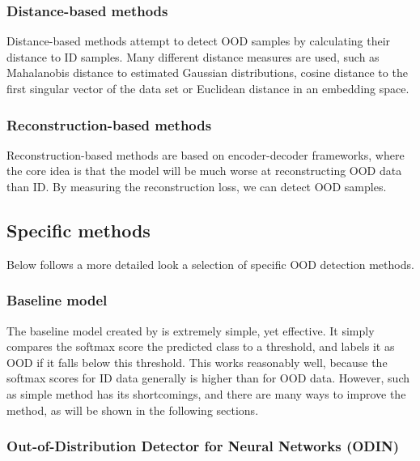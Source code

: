 \documentclass[UKenglish]{uiomasterthesis} %
\theoremstyle{definition}
\begin{document}
\subsubsection{Distance-based methods}

Distance-based methods attempt to detect OOD samples by calculating their distance to ID samples. Many different distance measures are used, such as Mahalanobis distance to estimated Gaussian distributions, cosine distance to the first singular vector of the data set or Euclidean distance in an embedding space.
\\

\subsubsection{Reconstruction-based methods}

Reconstruction-based methods are based on encoder-decoder frameworks, where the core idea is that the model will be much worse at reconstructing OOD data than ID. By measuring the reconstruction loss, we can detect OOD samples.
\\

\subsection{Specific methods} \label{ood_specific}

Below follows a more detailed look a selection of specific OOD detection methods.

\subsubsection{Baseline model} \label{ood_baseline}

The baseline model created by \cite{oodbaseline} is extremely simple, yet effective. It simply compares the softmax score the predicted class to a threshold, and labels it as OOD if it falls below this threshold. This works reasonably well, because the softmax scores for ID data generally is higher than for OOD data. However, such as simple method has its shortcomings, and there are many ways to improve the method, as will be shown in the following sections.
\\

\subsubsection{Out-of-Distribution Detector for Neural Networks (ODIN)} \label{ood_odin}
\end{document}
